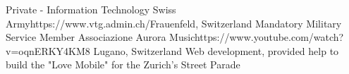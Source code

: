 \begin{CV}
        {Private - Information Technology}
        {Swiss Army}{https://www.vtg.admin.ch/}{Frauenfeld, Switzerland}
        {Mandatory Military Service}
        {Member}
        {Associazione Aurora Music}{https://www.youtube.com/watch?v=oqnERKY4KM8}
        {Lugano, Switzerland}
        {Web development, provided help to build the "Love Mobile" for the Zurich's 
        Street Parade}
\end{CV}